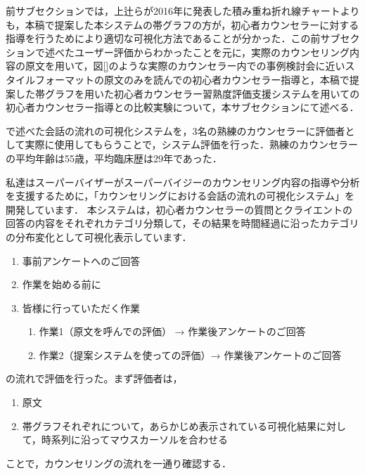 \documentclass[shuuron]{kuee}
\begin{document}
前サブセクションでは，上辻ら\cite{uetsuji}が2016年に発表した積み重ね折れ線チャートよりも，本稿で提案した本システムの帯グラフの方が，初心者カウンセラーに対する指導を行うためにより適切な可視化方法であることが分かった．この前サブセクションで述べたユーザー評価からわかったことを元に，実際のカウンセリング内容の原文を用いて，図\ref{}のような実際のカウンセラー内での事例検討会に近いスタイルフォーマットの原文のみを読んでの初心者カウンセラー指導と，本稿で提案した帯グラフを用いた初心者カウンセラー習熟度評価支援システムを用いての初心者カウンセラー指導との比較実験について，本サブセクションにて述べる．

で述べた会話の流れの可視化システムを，3名の熟練のカウンセラーに評価者として実際に使用してもらうことで，システム評価を行った．熟練のカウンセラーの平均年齢は55歳，平均臨床歴は29年であった．



私達はスーパーバイザーがスーパーバイジーのカウンセリング内容の指導や分析を支援するために，「カウンセリングにおける会話の流れの可視化システム」を開発しています．
本システムは，初心者カウンセラーの質問とクライエントの回答の内容をそれぞれカテゴリ分類して，その結果を時間経過に沿ったカテゴリの分布変化として可視化表示しています．








\begin{enumerate}

  \item 事前アンケートへのご回答
  \item 作業を始める前に
  \item 皆様に行っていただく作業
  \begin{enumerate}
    \item 作業1（原文を呼んでの評価） → 作業後アンケートのご回答
    \item 作業2（提案システムを使っての評価）→ 作業後アンケートのご回答
  \end{enumerate}
\end{enumerate}


の流れで評価を行った。まず評価者は，
\begin{enumerate}

  \item 原文
  \item 帯グラフそれぞれについて，あらかじめ表示されている可視化結果に対して，時系列に沿ってマウスカーソルを合わせる
\end{enumerate}


ことで，カウンセリングの流れを一通り確認する．
\end{document}
